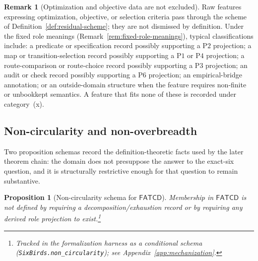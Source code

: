\documentclass[11pt]{article}
\newtheorem{proposition}[theorem]{Proposition}
\theoremstyle{definition}
\newtheorem{remark}[theorem]{Remark}
\newcommand{\FATCD}{\ensuremath{\mathsf{FATCD}}}
\newcommand{\Pone}{\ensuremath{\mathrm{P1}}}
\newcommand{\Ptwo}{\ensuremath{\mathrm{P2}}}
\newcommand{\Pthree}{\ensuremath{\mathrm{P3}}}
\newcommand{\Pfour}{\ensuremath{\mathrm{P4}}}
\newcommand{\Psix}{\ensuremath{\mathrm{P6}}}
\begin{document}
\begin{remark}[Optimization and objective data are not excluded]\label{rem:optimization-not-excluded}
Raw features expressing optimization, objective, or selection criteria
pass through the scheme of Definition~\ref{def:residual-scheme}; they
are not dismissed by definition. Under the fixed role meanings
(Remark~\ref{rem:fixed-role-meanings}), typical classifications
include: a predicate or specification record possibly supporting a
\Ptwo{} projection; a map or transition-selection record possibly
supporting a \Pone{} or \Pfour{} projection; a route-comparison or
route-choice record possibly supporting a \Pthree{} projection; an
audit or check record possibly supporting a \Psix{} projection; an
empirical-bridge annotation; or an outside-domain structure when the
feature requires non-finite or unbookkept semantics. A feature that
fits none of these is recorded under category~(x).
\end{remark}

\subsection{Non-circularity and non-overbreadth}\label{subsec:non-circularity-non-overbreadth}

Two proposition schemas record the definition-theoretic facts used by
the later theorem chain: the domain does not presuppose the answer to
the exact-six question, and it is structurally restrictive enough
for that question to remain substantive.

\begin{proposition}[Non-circularity schema for \FATCD{}]\label{prop:non-circularity}
Membership in \FATCD{} is not defined by requiring a
decomposition/exhaustion record or by requiring any derived role
projection to exist.\footnote{Tracked in the formalization harness as a conditional schema (\texttt{SixBirds.non\_circularity}); see Appendix~\ref{app:mechanization}.}
\end{proposition}
\end{document}
